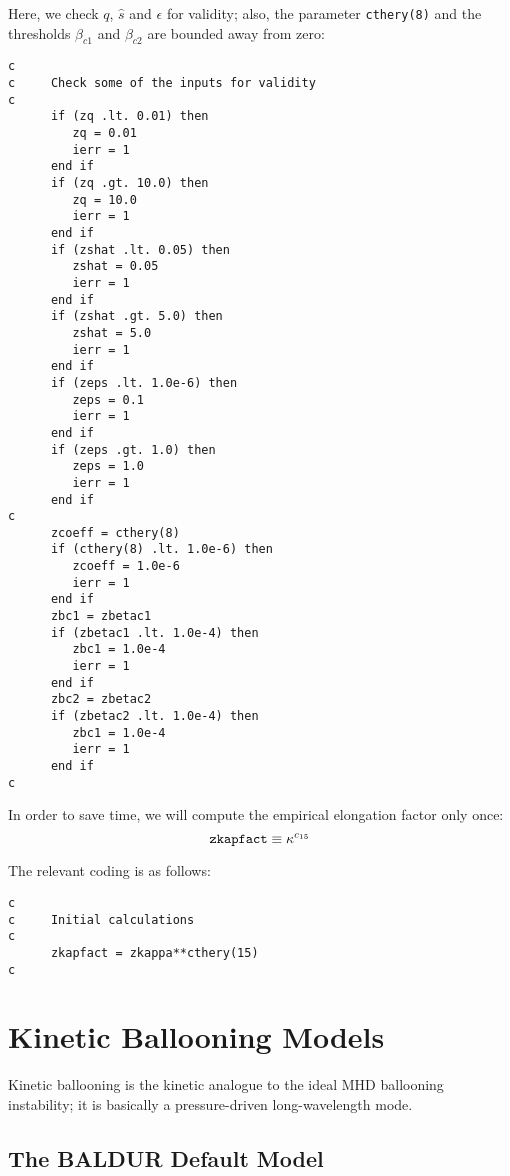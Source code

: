 Here, we check $q$, $\hat{s}$ and $\epsilon$ for validity; also, the
parameter {\tt cthery(8)} and the thresholds $\beta_{c1}$ and $\beta_{c2}$
are bounded away from zero:
\begin{verbatim}
c
c     Check some of the inputs for validity
c
      if (zq .lt. 0.01) then
         zq = 0.01
         ierr = 1
      end if
      if (zq .gt. 10.0) then
         zq = 10.0
         ierr = 1
      end if
      if (zshat .lt. 0.05) then
         zshat = 0.05
         ierr = 1
      end if
      if (zshat .gt. 5.0) then
         zshat = 5.0
         ierr = 1
      end if
      if (zeps .lt. 1.0e-6) then
         zeps = 0.1
         ierr = 1
      end if
      if (zeps .gt. 1.0) then
         zeps = 1.0
         ierr = 1
      end if
c
      zcoeff = cthery(8)
      if (cthery(8) .lt. 1.0e-6) then
         zcoeff = 1.0e-6
         ierr = 1
      end if
      zbc1 = zbetac1
      if (zbetac1 .lt. 1.0e-4) then
         zbc1 = 1.0e-4
         ierr = 1
      end if
      zbc2 = zbetac2
      if (zbetac2 .lt. 1.0e-4) then
         zbc1 = 1.0e-4
         ierr = 1
      end if
c
\end{verbatim}

In order to save time, we will compute the empirical elongation factor
only once:
\[
{\tt zkapfact} \equiv \kappa^{c_{15}}
\]

The relevant coding is as follows:

\begin{verbatim}
c
c     Initial calculations
c
      zkapfact = zkappa**cthery(15)
c
\end{verbatim}

\section{Kinetic Ballooning Models}

Kinetic ballooning is the kinetic analogue to the ideal MHD ballooning
instability; it is basically a pressure-driven long-wavelength mode.

\subsection{The BALDUR Default Model}

